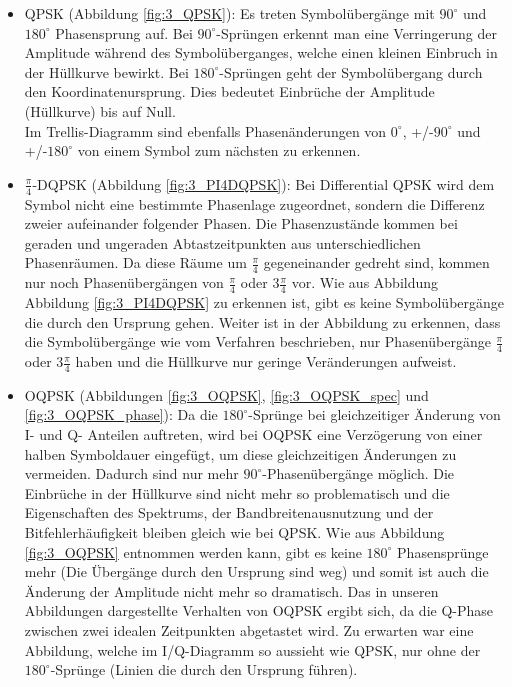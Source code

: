 \documentclass[12pt,a4paper,ngerman]{article}
\begin{document}
\begin{itemize}
\item QPSK (Abbildung \ref{fig:3_QPSK}): Es treten Symbolübergänge mit $90^\circ$ und $180^\circ$ Phasensprung auf. Bei $90^\circ$-Sprüngen erkennt man eine Verringerung der Amplitude während des Symbolüberganges, welche einen kleinen Einbruch in der Hüllkurve bewirkt. Bei $180^\circ$-Sprüngen geht der Symbolübergang durch den Koordinatenursprung. Dies bedeutet Einbrüche der Amplitude (Hüllkurve) bis auf Null.\\
Im Trellis-Diagramm sind ebenfalls Phasenänderungen von $0^\circ$, +/-$90^\circ$ und +/-$180^\circ$ von einem Symbol zum nächsten zu erkennen.
\item $\frac{\pi}{4}$-DQPSK (Abbildung \ref{fig:3_PI4DQPSK}): Bei Differential QPSK wird dem Symbol nicht eine bestimmte Phasenlage zugeordnet, sondern die Differenz zweier aufeinander folgender Phasen. Die Phasenzustände kommen bei geraden und ungeraden Abtastzeitpunkten aus unterschiedlichen Phasenräumen. Da diese Räume um  $\frac{\pi}{4}$ gegeneinander gedreht sind, kommen nur noch Phasenübergängen von  $\frac{\pi}{4}$ oder  $3\frac{\pi}{4}$ vor. Wie aus Abbildung Abbildung \ref{fig:3_PI4DQPSK} zu erkennen ist, gibt es keine Symbolübergänge die durch den Ursprung gehen. Weiter ist in der Abbildung zu erkennen, dass die Symbolübergänge wie vom Verfahren beschrieben, nur Phasenübergänge $\frac{\pi}{4}$ oder  $3\frac{\pi}{4}$ haben und die Hüllkurve nur geringe Veränderungen aufweist. 
\item OQPSK (Abbildungen \ref{fig:3_OQPSK}, \ref{fig:3_OQPSK_spec} und \ref{fig:3_OQPSK_phase}): Da die $180^\circ$-Sprünge bei gleichzeitiger Änderung von I- und Q- Anteilen auftreten, wird bei OQPSK eine Verzögerung von einer halben Symboldauer eingefügt, um diese gleichzeitigen Änderungen zu vermeiden. Dadurch sind nur mehr $90^\circ$-Phasenübergänge möglich. Die Einbrüche in der Hüllkurve sind nicht mehr so problematisch und die Eigenschaften des Spektrums, der Bandbreitenausnutzung und der Bitfehlerhäufigkeit bleiben gleich wie bei QPSK. Wie aus Abbildung \ref{fig:3_OQPSK} entnommen werden kann, gibt es keine $180^\circ$ Phasensprünge mehr (Die Übergänge durch den Ursprung sind weg) und somit ist auch die Änderung der Amplitude nicht mehr so dramatisch. Das in unseren Abbildungen dargestellte Verhalten von OQPSK ergibt sich, da die Q-Phase zwischen zwei idealen Zeitpunkten abgetastet wird. Zu erwarten war eine Abbildung, welche im I/Q-Diagramm so aussieht wie QPSK, nur ohne der $180^\circ$-Sprünge (Linien die durch den Ursprung führen).

\end{itemize}
\end{document}
